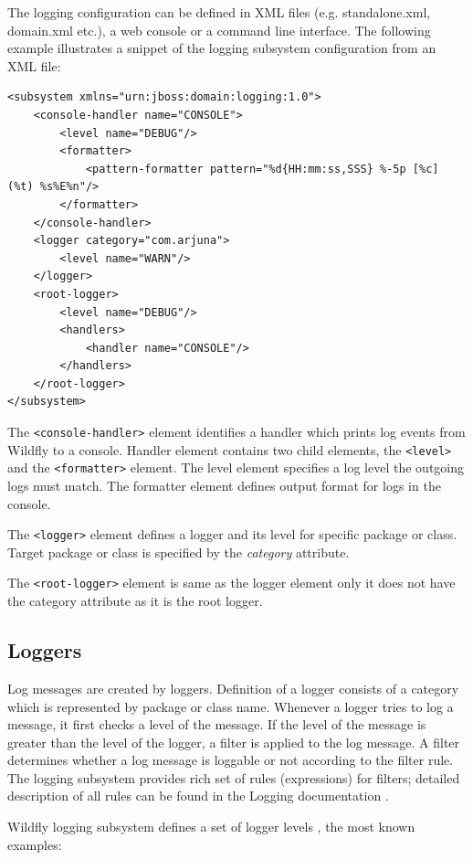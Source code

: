 \documentclass[12pt,oneside]{fithesis2}
\begin{document}
The logging configuration can be defined in XML files (e.g. standalone.xml, domain.xml etc.), a web console or a command line interface. The following example illustrates a snippet of the logging subsystem configuration from an XML file:

\begin{lstlisting}[caption = Configuring the logging subsystem, label = logging_subsystem, style=my_xml]
<subsystem xmlns="urn:jboss:domain:logging:1.0">
	<console-handler name="CONSOLE">
		<level name="DEBUG"/>
		<formatter>
			<pattern-formatter pattern="%d{HH:mm:ss,SSS} %-5p [%c] (%t) %s%E%n"/>
		</formatter>
	</console-handler>
	<logger category="com.arjuna">
		<level name="WARN"/>
	</logger>
	<root-logger>
		<level name="DEBUG"/>
		<handlers>
			<handler name="CONSOLE"/>
		</handlers>
	</root-logger>
</subsystem>
\end{lstlisting}
\noindent
The \verb|<console-handler>| element identifies a handler which prints log events from Wildfly to a console. Handler element contains two child elements, the \verb|<level>| and the \verb|<formatter>| element. The level element specifies a log level the outgoing logs must match. The formatter element defines output format for logs in the console.

The \verb|<logger>| element defines a logger and its level for specific package or class. Target package or class is specified by the \textit{category} attribute.

The \verb|<root-logger>| element is same as the logger element only it does not have the category attribute as it is the root logger.


\subsection{Loggers}
Log messages are created by loggers. Definition of a logger consists of a category which is represented by package or class name. Whenever a logger tries to log a message, it first checks a level of the message. If the level of the message is greater than the level of the logger, a filter is applied to the log message. A filter determines whether a log message is loggable or not according to the filter rule. The logging subsystem provides rich set of rules (expressions) for filters; detailed description of all rules can be found in the Logging documentation \cite[Logging Configuration]{wildfly_doc}.

Wildfly logging subsystem defines a set of logger levels \cite[Logging Configuration]{wildfly_doc}, the most known examples:
\end{document}
